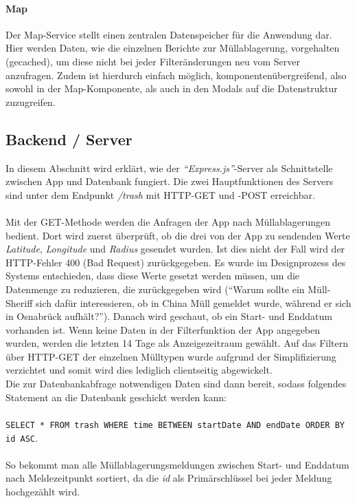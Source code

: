 \documentclass[a4paper, 11pt, DIV=11, listof=numbered, numbers=noenddot]{scrartcl}
\begin{document}
	\paragraph{Map}
	Der Map-Service stellt einen zentralen Datenspeicher für die Anwendung dar. Hier werden Daten, wie die einzelnen Berichte zur Müllablagerung, vorgehalten (gecached), um diese nicht bei jeder Filteränderungen neu vom Server anzufragen.
	Zudem ist hierdurch einfach möglich, komponentenübergreifend, also sowohl in der Map-Komponente, als auch in den Modals auf die Datenstruktur zuzugreifen.
	
	\subsection{Backend / Server}
	In diesem Abschnitt wird erklärt, wie der \textit{\enquote{Express.js}}-Server als Schnittstelle zwischen App und Datenbank fungiert. Die zwei Hauptfunktionen des Servers sind unter dem Endpunkt \textit{/trash} mit HTTP-GET und -POST erreichbar.\\
	\textbf{}\\
	Mit der GET-Methode werden die Anfragen der App nach Müllablagerungen bedient. Dort wird zuerst überprüft, ob die drei von der App zu sendenden Werte \textit{Latitude}, \textit{Longitude} und \textit{Radius} gesendet wurden. Ist dies nicht der Fall wird der HTTP-Fehler 400 (Bad Request) zurückgegeben.
	Es wurde im Designprozess des Systems entschieden, dass diese Werte gesetzt werden müssen, um die Datenmenge zu reduzieren, die zurückgegeben wird (\enquote{Warum sollte ein Müll-Sheriff sich dafür interessieren, ob in China Müll gemeldet wurde, während er sich in Osnabrück aufhält?}).
	Danach wird geschaut, ob ein Start- und Enddatum vorhanden ist. Wenn keine Daten in der Filterfunktion der App angegeben wurden, werden die letzten 14 Tage als Anzeigezeitraum gewählt. Auf das Filtern über HTTP-GET der einzelnen Mülltypen wurde aufgrund der Simplifizierung verzichtet und somit wird dies lediglich clientseitig abgewickelt.\\
	Die zur Datenbankabfrage notwendigen Daten sind dann bereit, sodass folgendes Statement an die Datenbank geschickt werden kann:\\
	\textbf{}\\
	\texttt{SELECT * FROM trash WHERE time BETWEEN startDate AND endDate ORDER BY id ASC}.\\
	\textbf{}\\
	So bekommt man alle Müllablagerungsmeldungen zwischen Start- und Enddatum nach Meldezeitpunkt sortiert, da die \textit{id} als Primärschlüssel bei jeder Meldung hochgezählt wird.
\end{document}
